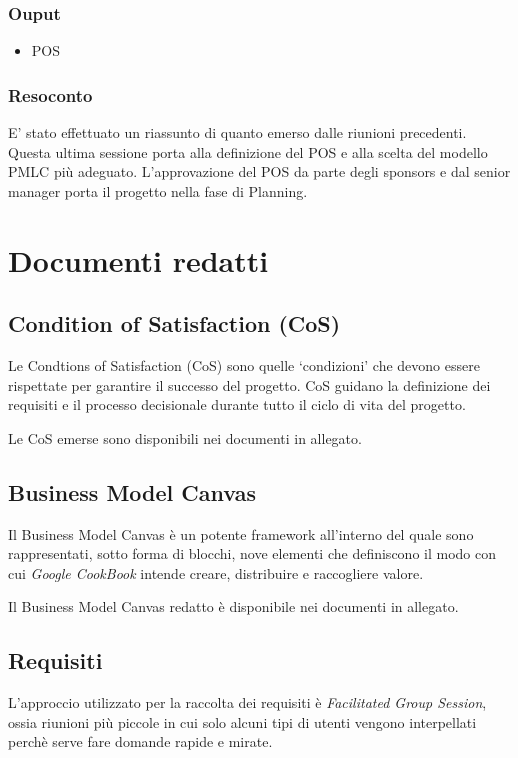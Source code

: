 \subsubsection*{Ouput}
\begin{itemize}
    \item POS
\end{itemize} 
\subsubsection*{Resoconto}
E' stato effettuato un riassunto di quanto emerso dalle riunioni precedenti.
Questa ultima sessione porta alla definizione del POS e alla scelta del modello PMLC più adeguato. 
L'approvazione del POS da parte degli sponsors e dal senior manager porta il progetto nella fase di Planning.


\section{Documenti redatti}

\subsection{Condition of Satisfaction (CoS)}

Le Condtions of Satisfaction (CoS) sono quelle `condizioni' che devono essere rispettate 
per garantire il successo del progetto. CoS guidano la definizione dei requisiti e il processo decisionale
durante tutto il ciclo di vita del progetto.

Le CoS emerse sono disponibili nei documenti in allegato.

\subsection{Business Model Canvas}
Il Business Model Canvas è un potente framework all'interno del quale sono rappresentati, sotto
forma di blocchi, nove elementi che definiscono il modo con cui \textit{Google CookBook} intende creare, distribuire
e raccogliere valore.

Il Business Model Canvas redatto è disponibile nei documenti in allegato.

\subsection{Requisiti}

L'approccio utilizzato per la raccolta dei requisiti è \textit{Facilitated Group Session}, ossia riunioni più piccole 
in cui solo alcuni tipi di utenti vengono interpellati perchè serve fare domande rapide e mirate.

